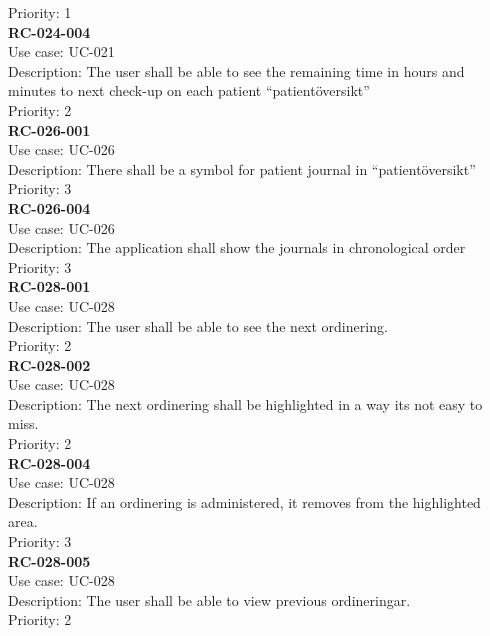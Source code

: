 Priority: 1 \\
\newline
\textbf{RC-024-004} \\
Use case: UC-021 \\
Description: The user shall be able to see the remaining time in hours and minutes to next check-up on each patient “patientöversikt” \\
Priority: 2 \\
\newline
\textbf{RC-026-001} \\
Use case: UC-026 \\
Description: There shall be a symbol for patient journal in “patientöversikt” \\
Priority: 3 \\
\newline
\textbf{RC-026-004} \\
Use case: UC-026 \\
Description: The application shall show the journals in chronological order\\
Priority: 3 \\
\newline
\textbf{RC-028-001} \\
Use case: UC-028 \\
Description: The user shall be able to see the next ordinering.\\
Priority: 2 \\
\newline
\textbf{RC-028-002} \\
Use case: UC-028 \\
Description: The next ordinering shall be highlighted in a way its not easy to miss.\\
Priority: 2 \\
\newline
\textbf{RC-028-004} \\
Use case: UC-028 \\
Description: If an ordinering is administered, it removes from the highlighted area.\\
Priority: 3 \\
\newline
\textbf{RC-028-005} \\
Use case: UC-028 \\
Description: The user shall be able to view previous ordineringar.\\
Priority: 2 \\


